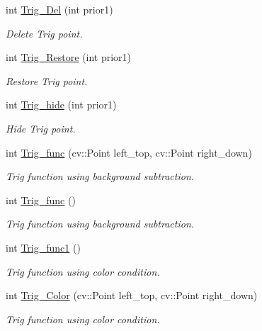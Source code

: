 \begin{DoxyCompactItemize}
int \hyperlink{class_mywebcam_1_1webcam_a2b213536b45a13d4abd8d34b0c19535c}{Trig\+\_\+\+Del} (int prior1)
\begin{DoxyCompactList}\small\item\em Delete Trig point. \end{DoxyCompactList}\item 
int \hyperlink{class_mywebcam_1_1webcam_a64f03adb86a05d550cf238c8beb22b1e}{Trig\+\_\+\+Restore} (int prior1)
\begin{DoxyCompactList}\small\item\em Restore Trig point. \end{DoxyCompactList}\item 
int \hyperlink{class_mywebcam_1_1webcam_a0cde3310fc2cc39b390816a7d95a6cb5}{Trig\+\_\+hide} (int prior1)
\begin{DoxyCompactList}\small\item\em Hide Trig point. \end{DoxyCompactList}\item 
int \hyperlink{class_mywebcam_1_1webcam_a8c3bece8802fa58e8de968bc65a36fd1}{Trig\+\_\+func} (cv\+::\+Point left\+\_\+top, cv\+::\+Point right\+\_\+down)
\begin{DoxyCompactList}\small\item\em Trig function using background subtraction. \end{DoxyCompactList}\item 
int \hyperlink{class_mywebcam_1_1webcam_aa47dab3d4fb51217bd09150adedbfc27}{Trig\+\_\+func} ()
\begin{DoxyCompactList}\small\item\em Trig function using background subtraction. \end{DoxyCompactList}\item 
int \hyperlink{class_mywebcam_1_1webcam_a66af4250efce2c454bcd9dee3a268f47}{Trig\+\_\+func1} ()
\begin{DoxyCompactList}\small\item\em Trig function using color condition. \end{DoxyCompactList}\item 
int \hyperlink{class_mywebcam_1_1webcam_a243224bf66ec95731a81bffc52fc00c3}{Trig\+\_\+\+Color} (cv\+::\+Point left\+\_\+top, cv\+::\+Point right\+\_\+down)
\begin{DoxyCompactList}\small\item\em Trig function using color condition. \end{DoxyCompactList}\end{DoxyCompactItemize}
